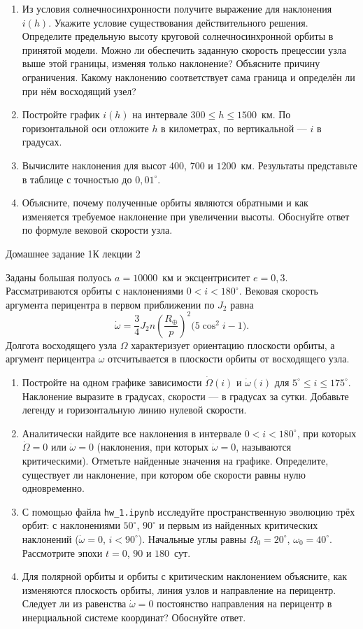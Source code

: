\documentclass[11pt,a4paper]{article}
\newcommand{\taskheading}[2]{%
  \par\vspace{5pt}{\large\bfseries\color{accent}Задание #1. #2}\par\smallskip}
\begin{document}
\begin{enumerate}
\item Из условия солнечносинхронности получите выражение для наклонения $i(h)$.
Укажите условие существования действительного решения.
Определите предельную высоту круговой солнечносинхронной орбиты в принятой модели.
Можно ли обеспечить заданную скорость прецессии узла выше этой границы,
изменяя только наклонение? Объясните причину ограничения.
Какому наклонению соответствует сама граница и определён ли при нём восходящий узел?
\item Постройте график $i(h)$ на интервале $300\leq h\leq1500$~км.
По горизонтальной оси отложите $h$ в километрах, по вертикальной --- $i$ в градусах.
\item Вычислите наклонения для высот $400$, $700$ и $1200$~км.
Результаты представьте в таблице с точностью до $0{,}01^\circ$.
\item Объясните, почему полученные орбиты являются обратными
и как изменяется требуемое наклонение при увеличении высоты.
Обоснуйте ответ по формуле вековой скорости узла.
\end{enumerate}

\newpage

{\small\color{muted}Домашнее задание 1\hfill К лекции 2}
\taskheading{2}{Прецессия плоскости орбиты и линии апсид}

Заданы большая полуось $a=10000$~км и эксцентриситет $e=0{,}3$.
Рассматриваются орбиты с наклонениями $0<i<180^\circ$.
Вековая скорость аргумента перицентра в первом приближении по $J_2$ равна
\[
\dot\omega=\frac{3}{4}J_2n\left(\frac{R_\oplus}{p}\right)^2
\bigl(5\cos^2 i-1\bigr).
\]
Долгота восходящего узла $\Omega$ характеризует ориентацию плоскости орбиты,
а аргумент перицентра $\omega$ отсчитывается в плоскости орбиты от восходящего узла.

\begin{enumerate}
\item Постройте на одном графике зависимости $\dot\Omega(i)$ и $\dot\omega(i)$
для $5^\circ\leq i\leq175^\circ$.
Наклонение выразите в градусах, скорости --- в градусах за сутки.
Добавьте легенду и горизонтальную линию нулевой скорости.
\item Аналитически найдите все наклонения в интервале $0<i<180^\circ$,
при которых $\dot\Omega=0$ или $\dot\omega=0$
(наклонения, при которых $\dot\omega=0$, называются критическими).
Отметьте найденные значения на графике.
Определите, существует ли наклонение, при котором обе скорости равны нулю одновременно.
\item С помощью файла \texttt{hw\_1.ipynb} исследуйте пространственную эволюцию
трёх орбит: с наклонениями $50^\circ$, $90^\circ$ и первым из найденных
критических наклонений ($\dot\omega=0$, $i<90^\circ$).
Начальные углы равны $\Omega_0=20^\circ$, $\omega_0=40^\circ$.
Рассмотрите эпохи $t=0$, $90$ и $180$~сут.
\item Для полярной орбиты и орбиты с критическим наклонением объясните,
как изменяются плоскость орбиты, линия узлов и направление на перицентр.
Следует ли из равенства $\dot\omega=0$ постоянство направления на перицентр
в инерциальной системе координат? Обоснуйте ответ.
\end{enumerate}
\end{document}
